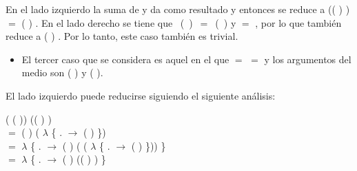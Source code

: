 \begin{AgdaAlign}
En el lado izquierdo la suma de  y  da como resultado  y entonces se reduce a   (( ) \AgdaFunction{+} ) $=$ ( ) \AgdaFunction{+} . En el lado derecho se tiene que \hbox{  ( ) $=$ ( )} y    $=$ , por lo que también reduce a ( ) \AgdaFunction{+} . Por lo tanto, este caso también es trivial.

\begin{itemize}
\item El tercer caso que se considera es aquel en el que  $=$  $=$  y los argumentos del medio son ( ) y ( ). 
\end{itemize}

El lado izquierdo puede reducirse siguiendo el siguiente análisis: 

 ( \AgdaFunction{+} ( )) (( ) \AgdaFunction{+} ) \\ 
$=$  ( ) ( $\lambda$ \{ . $\rightarrow$ ( ) \AgdaFunction{+}  \}) \\
$=$  $\lambda$ \{ . $\rightarrow$  ( ) ( ( $\lambda$ \{ . $\rightarrow$ ( ) \AgdaFunction{+}  \})) \}\\ 
$=$  $\lambda$ \{ . $\rightarrow$  ( ) (( ) \AgdaFunction{+} ) \}


\end{AgdaAlign}
